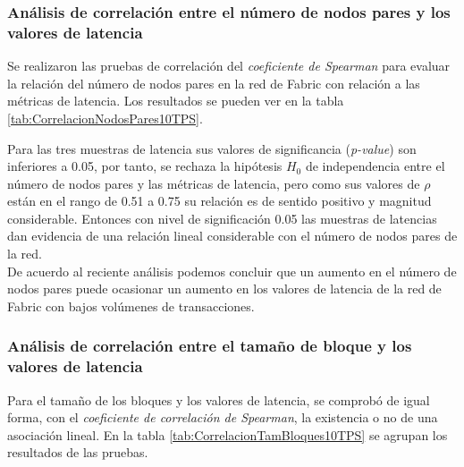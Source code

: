  
\subsubsection{An\'alisis de correlaci\'on entre el n\'umero de nodos pares y los valores de latencia}
Se realizaron las pruebas de correlaci\'on del \emph{coeficiente de Spearman} para evaluar la relaci\'on del n\'umero de nodos pares en la red de Fabric con relaci\'on a las m\'etricas de latencia. Los resultados se pueden ver en la tabla \ref{tab:CorrelacionNodosPares10TPS}.\\

\begin{table}[htb]
\centering
{}
\caption{Resultados de aplicar el \emph{coeficiente de correlaci\'on de Spearman} entre el n\'umero de nodos pares y las muestras de latencia en redes con un flujo de 10 TPS.}
\label{tab:CorrelacionNodosPares10TPS}
\end{table}

\newpage

Para las tres muestras de latencia sus valores de significancia (\emph{p-value}) son inferiores a 0.05, por tanto, se rechaza la hip\'otesis $H_0$ de independencia entre el n\'umero de nodos pares y las m\'etricas de latencia, pero como sus valores de $\rho$ est\'an en el rango de 0.51 a 0.75 su relaci\'on es de sentido positivo y magnitud considerable. Entonces con nivel de significaci\'on 0.05 las muestras de latencias dan evidencia de una relaci\'on lineal considerable con el n\'umero de nodos pares de la red.\\
  
De acuerdo al reciente an\'alisis podemos concluir que un aumento en el n\'umero de nodos pares puede ocasionar un aumento en los valores de latencia de la red de Fabric con bajos vol\'umenes de transacciones.\\


\subsubsection{An\'alisis de correlaci\'on entre el tama\~no de bloque y los valores de latencia}
Para el tama\~no de los bloques y los valores de latencia, se comprob\'o de igual forma, con el \emph{coeficiente de correlaci\'on de Spearman}, la existencia o no de una asociaci\'on lineal. En la tabla \ref{tab:CorrelacionTamBloques10TPS} se agrupan los resultados de las pruebas.\\

